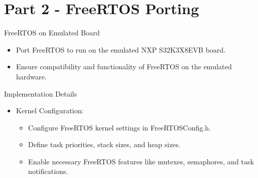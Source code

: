 \section{Part 2 - FreeRTOS Porting}

\begin{frame}{FreeRTOS on Emulated Board}
    \begin{itemize}
        \item Port FreeRTOS to run on the emulated NXP S32K3X8EVB board.
        \item Ensure compatibility and functionality of FreeRTOS on the emulated hardware.
    \end{itemize}
\end{frame}

\begin{frame}{Implementation Details}
    \begin{itemize}
        \item Kernel Configuration:
        \begin{itemize}
            \item Configure FreeRTOS kernel settings in FreeRTOSConfig.h.
            \item Define task priorities, stack sizes, and heap sizes.
            \item Enable necessary FreeRTOS features like mutexes, semaphores, and task notifications.
        \end{itemize}
    \end{itemize}
\end{frame}
